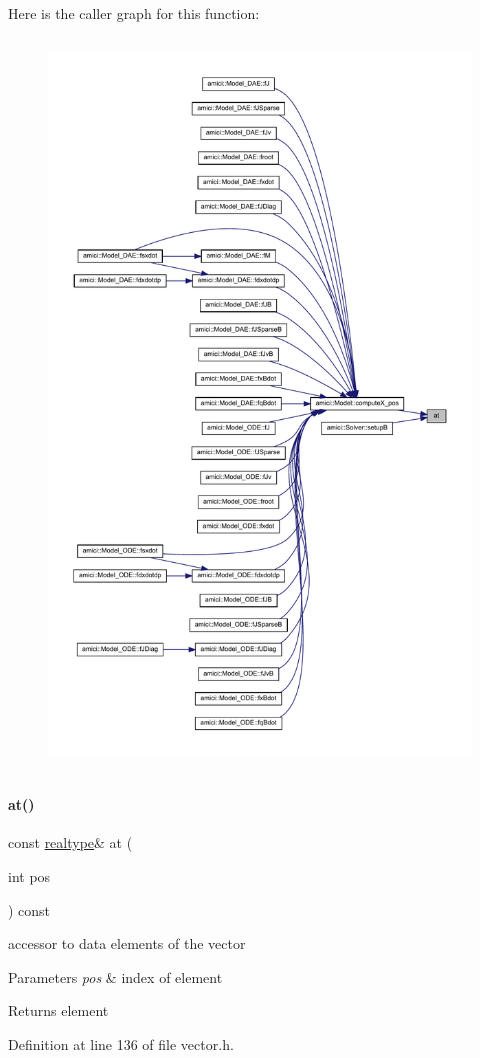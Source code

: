 Here is the caller graph for this function\+:
\nopagebreak
\begin{figure}[H]
\begin{center}
\leavevmode
\includegraphics[height=550pt]{classamici_1_1_ami_vector_ae62cf934983479ccb255785bdf455a2c_icgraph}
\end{center}
\end{figure}
\mbox{\label{classamici_1_1_ami_vector_aa15689120d419cd3d858bc62bc024cb9}} 
\paragraph{\texorpdfstring{at()}{at()}\hspace{0.1cm}{\footnotesize\ttfamily [2/2]}}
{\footnotesize\ttfamily const \mbox{\hyperlink{namespaceamici_a1bdce28051d6a53868f7ccbf5f2c14a3}{realtype}}\& at (\begin{DoxyParamCaption}\item[{int}]{pos }\end{DoxyParamCaption}) const}

accessor to data elements of the vector 
\begin{DoxyParams}{Parameters}
{\em pos} & index of element \\
\hline
\end{DoxyParams}
\begin{DoxyReturn}{Returns}
element 
\end{DoxyReturn}


Definition at line 136 of file vector.\+h.

